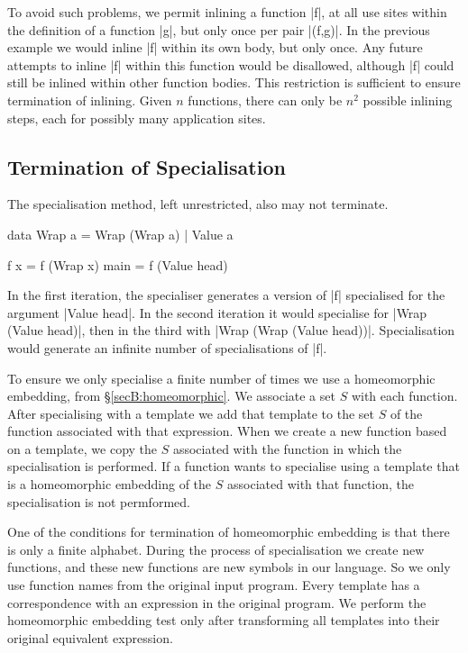 To avoid such problems, we permit inlining a function |f|, at all use sites within the definition of a function |g|, but only once per pair |(f,g)|. In the previous example we would inline |f| within its own body, but only once. Any future attempts to inline |f| within this function would be disallowed, although |f| could still be inlined within other function bodies. This restriction is sufficient to ensure termination of inlining. Given $n$ functions, there can only be $n^2$ possible inlining steps, each for possibly many application sites.


\subsection{Termination of Specialisation}
\label{secF:termination_specialisation}

The specialisation method, left unrestricted, also may not terminate.

\begin{example}
\label{exF:wrap}
\begin{code}
data Wrap a  =  Wrap (Wrap a)
             |  Value a

f x = f (Wrap x)
main = f (Value head)
\end{code}

In the first iteration, the specialiser generates a version of |f| specialised for the argument |Value head|. In the second iteration it would specialise for |Wrap (Value head)|, then in the third with |Wrap (Wrap (Value head))|. Specialisation would generate an infinite number of specialisations of |f|.
\end{example}

To ensure we only specialise a finite number of times we use a homeomorphic embedding, from \S\ref{secB:homeomorphic}. We associate a set $S$ with each function. After specialising with a template we add that template to the set $S$ of the function associated with that expression. When we create a new function based on a template, we copy the $S$ associated with the function in which the specialisation is performed. If a function wants to specialise using a template that is a homeomorphic embedding of the $S$ associated with that function, the specialisation is not permformed.

One of the conditions for termination of homeomorphic embedding is that there is only a finite alphabet. During the process of specialisation we create new functions, and these new functions are new symbols in our language. So we only use function names from the original input program. Every template has a correspondence with an expression in the original program. We perform the homeomorphic embedding test only after transforming all templates into their original equivalent expression.

